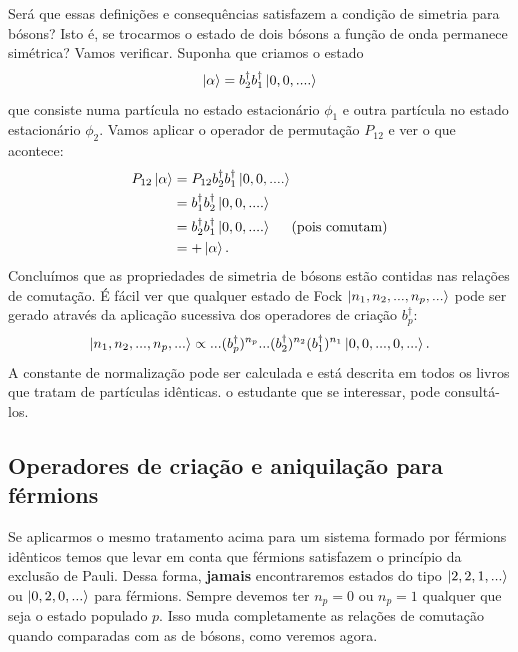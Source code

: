 \documentclass{article}
\begin{document}
Será que essas definições e consequências satisfazem a condição de simetria para bósons? Isto é, se trocarmos o estado de dois bósons a função de onda permanece simétrica? Vamos verificar. Suponha que criamos o estado
\begin{equation}
    \ket{\alpha} = b_2^{\dagger}b_1^\dagger \ket{0,0,....}
\end{equation}
que consiste numa partícula no estado estacionário $\phi_1$ e outra partícula no estado estacionário $\phi_2$. Vamos aplicar o operador de permutação $P_{12}$ e ver o que acontece:
\begin{equation}
\begin{split}
    P_{12}\ket{\alpha} &= P_{12} b_2^{\dagger}b_1^\dagger \ket{0,0,....} \\
                       &= b_1^{\dagger}b_2^\dagger \ket{0,0,....} \\
                       &= b_2^{\dagger}b_1^\dagger \ket{0,0,....} \hspace{0.5cm} \text{(pois comutam)}\\ 
                       &= +\ket{\alpha}.
\end{split}
\end{equation}
Concluímos que as propriedades de simetria de bósons estão contidas nas relações de comutação. É fácil ver que qualquer estado de Fock $\ket{n_1,n_2,...,n_p,...}$ pode ser gerado através da aplicação sucessiva dos operadores de criação $b_p^\dagger$:
\begin{equation}
    \ket{n_1,n_2,...,n_p,...} \propto ...(b^\dagger_{p})^{n_p}...(b^\dagger_{2})^{n_2}(b^\dagger_{1})^{n_1}\ket{0,0,...,0,...}.
\end{equation}
A constante de normalização pode ser calculada e está descrita em todos os livros que tratam de partículas idênticas. o estudante que se interessar, pode consultá-los.

\subsection{Operadores de criação e aniquilação para férmions}

Se aplicarmos o mesmo tratamento acima para um sistema formado por férmions idênticos temos que levar em conta que férmions satisfazem o princípio da exclusão de Pauli. Dessa forma, \textbf{jamais} encontraremos estados do tipo $\ket{2,2,1,...} $ ou $\ket{0,2,0,...}$ para férmions. Sempre devemos ter $n_p = 0$ ou $n_p = 1$ qualquer que seja o estado populado $p$. Isso muda completamente as relações de comutação quando comparadas com as de bósons, como veremos agora.
\end{document}
